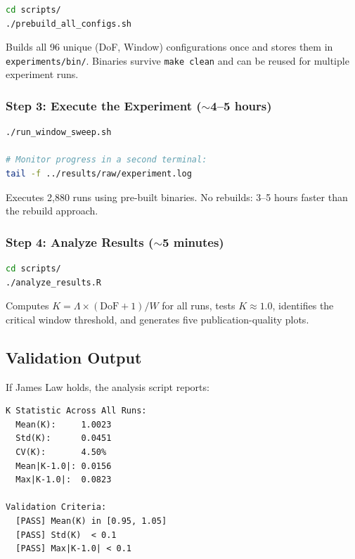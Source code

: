 \begin{lstlisting}[language=bash]
cd scripts/
./prebuild_all_configs.sh
\end{lstlisting}

Builds all 96 unique (DoF, Window) configurations once and stores them in
\texttt{experiments/bin/}. Binaries survive \texttt{make clean} and can be
reused for multiple experiment runs.

\subsubsection{Step 3: Execute the Experiment ($\sim$4--5 hours)}

\begin{lstlisting}[language=bash]
./run_window_sweep.sh

# Monitor progress in a second terminal:
tail -f ../results/raw/experiment.log
\end{lstlisting}

Executes 2{,}880 runs using pre-built binaries. No rebuilds: 3--5 hours
faster than the rebuild approach.

\subsubsection{Step 4: Analyze Results ($\sim$5 minutes)}

\begin{lstlisting}[language=bash]
cd scripts/
./analyze_results.R
\end{lstlisting}

Computes $K = \Lambda \times (\text{DoF}+1) / W$ for all runs, tests
$K \approx 1.0$, identifies the critical window threshold, and generates
five publication-quality plots.

\subsection{Validation Output}

If James Law holds, the analysis script reports:

\begin{lstlisting}
K Statistic Across All Runs:
  Mean(K):     1.0023
  Std(K):      0.0451
  CV(K):       4.50%
  Mean|K-1.0|: 0.0156
  Max|K-1.0|:  0.0823

Validation Criteria:
  [PASS] Mean(K) in [0.95, 1.05]
  [PASS] Std(K)  < 0.1
  [PASS] Max|K-1.0| < 0.1
\end{lstlisting}

